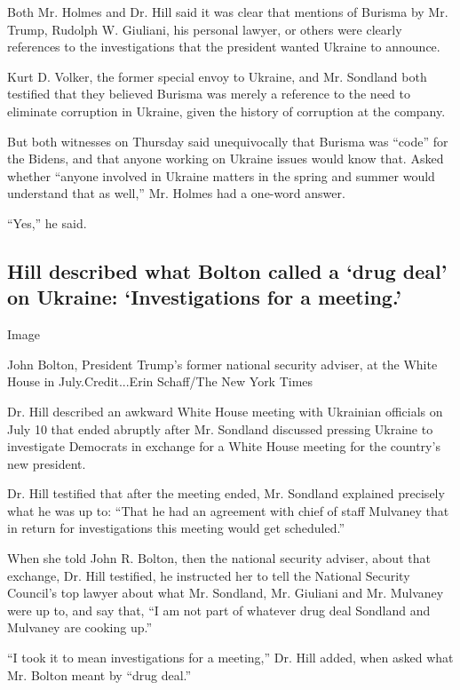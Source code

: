Both Mr. Holmes and Dr. Hill said it was clear that mentions of Burisma
by Mr. Trump, Rudolph W. Giuliani, his personal lawyer, or others were
clearly references to the investigations that the president wanted
Ukraine to announce.

Kurt D. Volker, the former special envoy to Ukraine, and Mr. Sondland
both testified that they believed Burisma was merely a reference to the
need to eliminate corruption in Ukraine, given the history of corruption
at the company.

But both witnesses on Thursday said unequivocally that Burisma was
``code'' for the Bidens, and that anyone working on Ukraine issues would
know that. Asked whether ``anyone involved in Ukraine matters in the
spring and summer would understand that as well,'' Mr. Holmes had a
one-word answer.

``Yes,'' he said.

\hypertarget{hill-described-what-bolton-called-a-drug-deal-on-ukraine-investigations-for-a-meeting}{%
\subsection{Hill described what Bolton called a `drug deal' on Ukraine:
`Investigations for a
meeting.'}\label{hill-described-what-bolton-called-a-drug-deal-on-ukraine-investigations-for-a-meeting}}

Image

John Bolton, President Trump's former national security adviser, at the
White House in July.Credit...Erin Schaff/The New York Times

Dr. Hill described an awkward White House meeting with Ukrainian
officials on July 10 that ended abruptly after Mr. Sondland discussed
pressing Ukraine to investigate Democrats in exchange for a White House
meeting for the country's new president.

Dr. Hill testified that after the meeting ended, Mr. Sondland explained
precisely what he was up to: ``That he had an agreement with chief of
staff Mulvaney that in return for investigations this meeting would get
scheduled.''

When she told John R. Bolton, then the national security adviser, about
that exchange, Dr. Hill testified, he instructed her to tell the
National Security Council's top lawyer about what Mr. Sondland, Mr.
Giuliani and Mr. Mulvaney were up to, and say that, ``I am not part of
whatever drug deal Sondland and Mulvaney are cooking up.''

``I took it to mean investigations for a meeting,'' Dr. Hill added, when
asked what Mr. Bolton meant by ``drug deal.''

